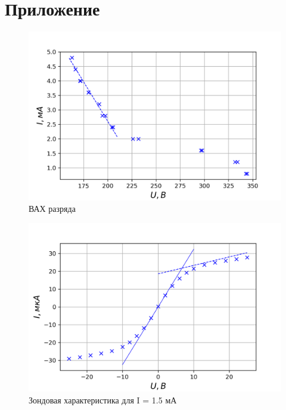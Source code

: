 \documentclass[a4paper, 12pt]{article}
\begin{document}
\newpage
\section{Приложение}

\begin{figure}[h!]
\begin{center}
\includegraphics{VAH.png}
\end{center}
\caption{ВАХ разряда}
\label{VAH_graph}
\end{figure}

\begin{figure}[h!]
\begin{center}
\includegraphics{Zond1.png}
\end{center}
\caption{Зондовая характеристика для I = 1.5 мА}
\label{Zond1_graph}
\end{figure}
\end{document}
